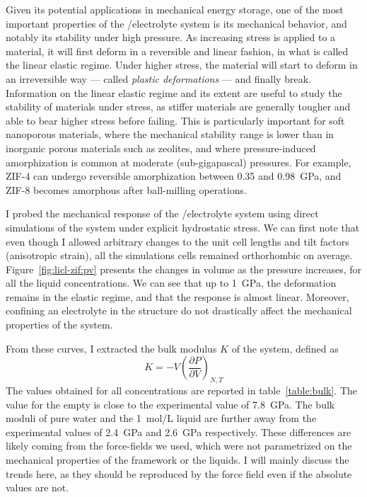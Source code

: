 \documentclass[thesis]{subfiles}
\begin{document}
Given its potential applications in mechanical energy storage, one of the most
important properties of the /electrolyte system is its mechanical behavior,
and notably its stability under high pressure. As increasing stress is applied
to a material, it will first deform in a reversible and linear fashion, in what
is called the linear elastic regime. Under higher stress, the material will
start to deform in an irreversible way --- called \emph{plastic deformations}
--- and finally break. Information on the linear elastic regime and its extent
are useful to study the stability of materials under stress, as stiffer
materials are generally tougher and able to bear higher stress before failing.
This is particularly important for soft nanoporous materials, where the
mechanical stability range is lower than in inorganic porous materials such as
zeolites, and where pressure-induced amorphization is common at moderate
(sub-gigapascal) pressures. For example, ZIF-4 can undergo reversible
amorphization between 0.35 and \SI{0.98}{GPa}\cite{Bennett2011}, and ZIF-8
becomes amorphous after ball-milling operations\cite{Cao2012, AOrtiz2013}.

I probed the mechanical response of the /electrolyte system using direct
simulations of the system under explicit hydrostatic stress. We can first note
that even though I allowed arbitrary changes to the unit cell lengths and tilt
factors (anisotropic strain), all the simulations cells remained orthorhombic on
average. Figure~\ref{fig:licl-zif:pv} presents the changes in volume as the
pressure increases, for all the liquid concentrations. We can see that up to
\SI{1}{GPa}, the deformation remains in the elastic regime, and that the
response is almost linear. Moreover, confining an electrolyte in the 
structure do not drastically affect the mechanical properties of the system.

From these curves, I extracted the bulk modulus $K$ of the system, defined as
\[K = -V\left(\frac{\partial P}{\partial V}\right)_{N,T}\]
The values obtained for all concentrations are reported in
table~\ref{table:bulk}. The value for the empty  is close to the
experimental\cite{Tan2012} value of \SI{7.8}{GPa}. The bulk moduli of pure water
and the \SI{1}{mol/L} liquid are further away from the experimental
values\cite{Lanman1934} of \SI{2.4}{GPa} and \SI{2.6}{GPa} respectively. These
differences are likely coming from the force-fields we used, which were not
parametrized on the mechanical properties of the framework or the liquids. I
will mainly discuss the trends here, as they should be reproduced by the force
field even if the absolute values are not.
\end{document}
